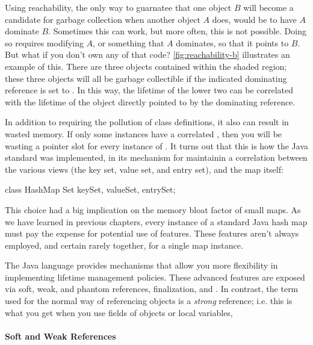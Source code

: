 Using reachability, the only way to guarnatee that one object
$B$ will become a candidate for garbage collection when another object $A$ does,
would be to have $A$ dominate $B$. Sometimes this can work, but more often,
this is not possible. Doing so requires modifying $A$, or something that $A$
dominates, so that it points to $B$. But what if you don't own any of that code?
\autoref{fig:reachability-b} illustrates an example of this. There are three
objects contained within the shaded region; these three objects will all be garbage collectible if
the indicated dominating reference is set to . In this way, the
lifetime of the lower two can be correlated with the lifetime of the object
directly pointed to by the dominating reference.

In addition to requiring the pollution of class definitions, it also can result
in wasted memory. If only some  instances have a correlated ,
then you will be wasting a pointer slot for every instance of . It turns
out that this is how the Java standard  was implemented, in its
mechanism for maintainin a correlation between the various views (the key set,
value set, and entry set), and the map itself:
\begin{shortlisting}
class HashMap {
   Set keySet, valueSet, entrySet;
}
\end{shortlisting}
This choice had a big implication on the memory bloat factor of small maps. As
we have learned in previous chapters, every instance of a standard Java hash map
must pay the expense for potential use of features. These features aren't
always employed, and certain rarely together, for a single map instance.

The Java language provides mechanisms that allow you more flexibility in
implementing lifetime management policies. These advanced features are exposed
via soft, weak, and phantom references, finalization, and \tls. In contrast, the
term used for the normal way of referencing objects is a \emph{strong}
reference; i.e. this is what you get when you use
fields of objects or local variables,


\paragraph{Soft and Weak References}

